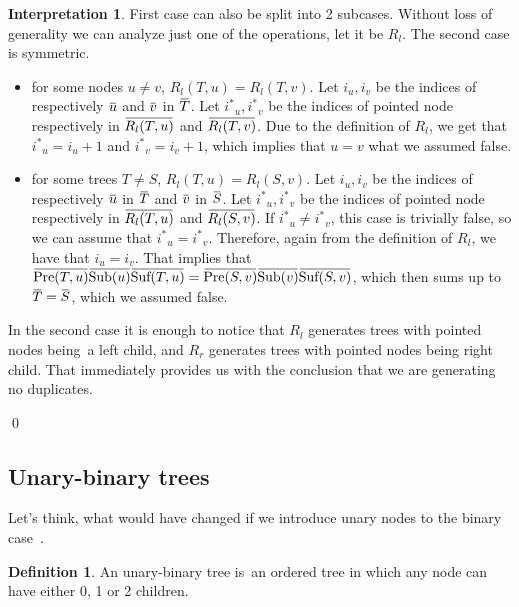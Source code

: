 \documentclass[final]{article}
\theoremstyle{definition}
\newtheorem{definition}{Definition}[subsection]
\theoremstyle{definition}
\newtheorem{interpretation}{Interpretation}[subsection]
\theoremstyle{remark}
\newcommand{\ols}[1]{\mskip.5\thinmuskip\overline{\mskip-.5\thinmuskip {#1} \mskip-.5\thinmuskip}\mskip.5\thinmuskip} %
\newcommand{\enc}[1]{\ensuremath{\ols{#1}}}
\newcommand{\pointed}[1]{\ensuremath{{#1}^*}}
\DeclareMathOperator{\tSub}{\text{Sub}}
\DeclareMathOperator{\tPre}{\text{Pre}}
\DeclareMathOperator{\tSuf}{\text{Suf}}
\begin{document}
\begin{interpretation}
First case can also be split into 2 subcases. Without loss of generality we can analyze just one of the operations, let it be \(R_l\). The second case is symmetric.
\begin{itemize}
    \item for some nodes \(u \neq v\), \(R_l(T, u) = R_l(T, v)\). Let \(i_u, i_v\) be the indices of respectively \(\enc{u}\) and \(\enc{v}\) in \(\enc{T}\). Let \(\pointed{i}_u, \pointed{i}_v\) be the indices of pointed node respectively in \(\enc{R_l(T, u)}\) and \(\enc{R_l(T, v)}\). Due to the definition of \(R_l\), we get that \(\pointed{i}_u = i_u + 1\) and \(\pointed{i}_v = i_v + 1\), which implies that \(u = v\) what we assumed false.
    \item for some trees \(T \neq S\), \(R_l(T, u) = R_l(S, v)\). Let \(i_u, i_v\) be the indices of respectively \(\enc{u}\) in \(\enc{T}\) and \(\enc{v}\) in \(\enc{S}\). Let \(\pointed{i}_u, \pointed{i}_v\) be the indices of pointed node respectively in \(\enc{R_l(T, u)}\) and \(\enc{R_l(S, v)}\). If \(\pointed{i}_u \neq \pointed{i}_v\), this case is trivially false, so we can assume that \(\pointed{i}_u = \pointed{i}_v\). Therefore, again from the definition of \(R_l\), we have that \(i_u = i_v\). That implies that \(\enc{\tPre(T, u)} \enc{\tSub(u)} \enc{\tSuf(T, u)} = \enc{\tPre(S, v)} \enc{\tSub(v)} \enc{\tSuf(S, v)} \), which then sums up to \(\enc{T} = \enc{S}\), which we assumed false.
\end{itemize}

In the second case it is enough to notice that \(R_l\) generates trees with pointed nodes being~a left child, and \(R_r\) generates trees with pointed nodes being right child. That immediately provides us with the conclusion that we are generating no duplicates.

\qed
\end{interpretation}

\subsection{Unary-binary trees}%
\label{sub:unary_binary_trees}

Let's think, what would have changed if we introduce unary nodes to the binary case~\cite{motzkin}.

\begin{definition}
    \label{def:unary_binary_tree}
    An unary-binary tree is~an ordered tree in which any node can have either 0, 1 or 2 children.
\end{definition}
\end{document}
